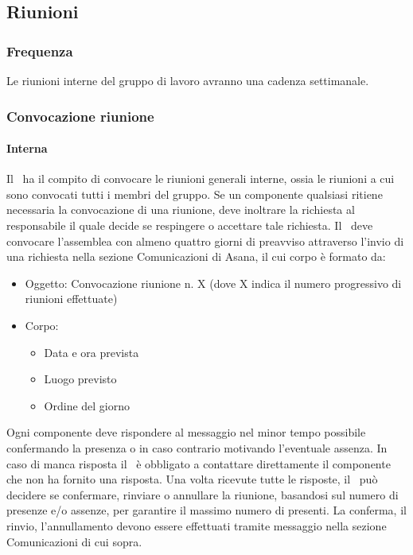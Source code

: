\documentclass[../NormeDiProgetto.tex]{subfiles}
\begin{document}
					
			\subsection{Riunioni}
				\subsubsection{Frequenza}
					Le riunioni interne del gruppo di lavoro avranno una cadenza settimanale.
				\subsubsection{Convocazione riunione}
					\paragraph{Interna\\}
						Il \responsabilediprogetto\ ha il compito di convocare le riunioni generali interne, ossia
						le riunioni a cui sono convocati tutti i membri del gruppo.
						Se un componente qualsiasi ritiene necessaria la convocazione di una riunione, deve
						inoltrare la richiesta al responsabile il quale decide se respingere o accettare
						tale richiesta.
						Il \responsabilediprogetto\ deve convocare l'assemblea con almeno quattro giorni di preavviso
						attraverso l'invio di una richiesta nella sezione Comunicazioni di Asana, il cui
						corpo è formato da:
						\begin{itemize}
							\item Oggetto: Convocazione riunione n. X (dove X indica il numero progressivo
							di riunioni effettuate)
							\item Corpo:
							\begin{itemize}
								\item Data e ora prevista
								\item Luogo previsto
								\item Ordine del giorno
							\end{itemize}
						\end{itemize}
						Ogni componente deve rispondere al messaggio nel minor tempo possibile confermando
						la presenza o in caso contrario motivando l'eventuale assenza. In caso di manca risposta
						il \responsabilediprogetto\ è obbligato a contattare direttamente il componente che non
						ha fornito una risposta. Una volta ricevute tutte le risposte, il \responsabilediprogetto\
						può decidere se confermare, rinviare o annullare la riunione, basandosi sul numero di
						presenze e/o assenze, per garantire il massimo numero di presenti. La conferma, il rinvio,
						l'annullamento devono essere effettuati tramite messaggio nella sezione Comunicazioni di cui
						sopra.
\end{document}
